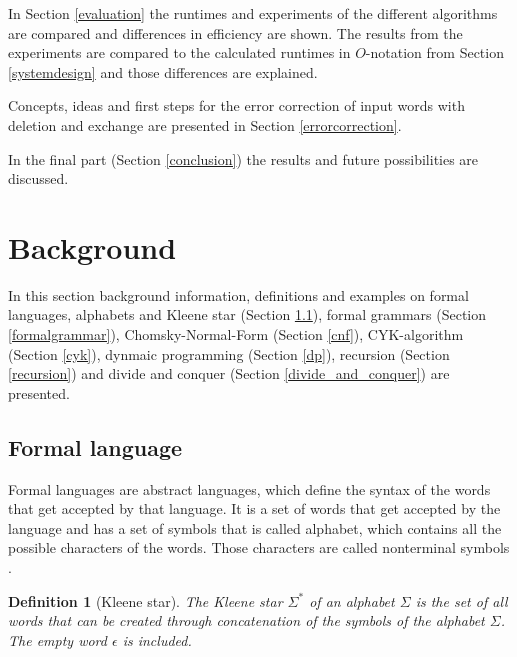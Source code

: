 \documentclass[a4paper, 11pt]{article}
\newtheorem*{definition*}{Definition}
\begin{document}
In Section \ref{evaluation} the runtimes and experiments of the different algorithms are compared and differences in efficiency are shown. The results from the experiments are compared to the calculated runtimes in $O$-notation from Section \ref{systemdesign} and those differences are explained.

Concepts, ideas and first steps for the error correction of input words with deletion and exchange are presented in Section \ref{errorcorrection}.


In the final part (Section \ref{conclusion}) the results and future possibilities are discussed.




\pagebreak














\section{Background}

In this section background information, definitions and examples on formal languages, alphabets and Kleene star (Section \ref{formallanguage}), formal grammars (Section \ref{formalgrammar}), Chomsky-Normal-Form (Section \ref{cnf}), CYK-algorithm (Section \ref{cyk}), dynmaic programming (Section \ref{dp}), recursion (Section \ref{recursion}) and divide and conquer (Section \ref{divide_and_conquer}) are presented. 


\subsection{Formal language}
\label{formallanguage}


Formal languages are abstract languages, which define the syntax of the words that get accepted by that language. It is a set of words that get accepted by the language and has a set of symbols that is called alphabet, which contains all the possible characters of the words. Those characters are called nonterminal symbols \cite{CNF, language}. 

\begin{definition*}[Kleene star]
The Kleene star $\Sigma^*$ of an alphabet $\Sigma$ is the set of all words that can be created through concatenation of the symbols of the alphabet $\Sigma$. The empty word $\epsilon$ is included. 
\end{definition*}
\end{document}
